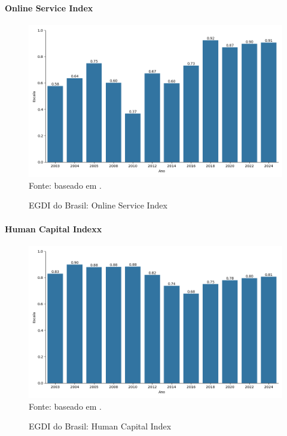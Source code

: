 \paragraph{Online Service Index}

\begin{figure}[H]
	\centering
	\caption{EGDI do Brasil: Online Service Index}
	\includegraphics[width=1\linewidth]{figuras/egdi/egdi_brasil_osi.png}
	\label{fig:egdi_brasil_osi}
	\footnotesize{Fonte: baseado em \cite{ONU_edgi_mapa}.}
\end{figure}

\paragraph{Human Capital Indexx}

\begin{figure}[H]
	\centering
	\caption{EGDI do Brasil: Human Capital Index}
	\includegraphics[width=1\linewidth]{figuras/egdi/egdi_brasil_hci.png}
	\label{fig:egdi_brasil_hci}
	\footnotesize{Fonte: baseado em \cite{ONU_edgi_mapa}.}
\end{figure}


